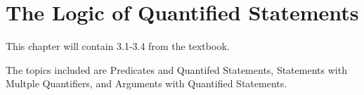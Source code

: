 \documentclass[../discrete.tex]{subfiles}
\begin{document}
\chapter{The Logic of Quantified Statements}
This chapter will contain 3.1-3.4 from the textbook.

The topics included are Predicates and Quantifed Statements, Statements with Multple Quantifiers, and Arguments with Quantified Statements. 
\end{document}

